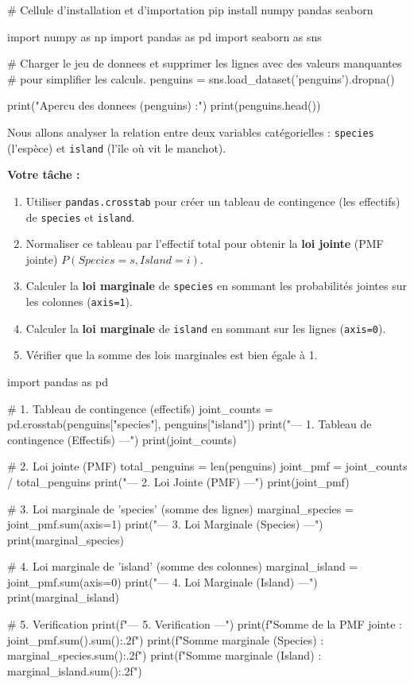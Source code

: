 \begin{codecell}
# Cellule d'installation et d'importation
pip install numpy pandas seaborn
\end{codecell}

\begin{codecell}
import numpy as np
import pandas as pd
import seaborn as sns

# Charger le jeu de donnees et supprimer les lignes avec des valeurs manquantes
# pour simplifier les calculs.
penguins = sns.load_dataset('penguins').dropna()

print("Apercu des donnees (penguins) :")
print(penguins.head())
\end{codecell}

\begin{exercicebox}
Nous allons analyser la relation entre deux variables catégorielles : \texttt{species} (l'espèce) et \texttt{island} (l'île où vit le manchot).

\textbf{Votre tâche :}
\begin{enumerate}
    \item Utiliser \texttt{pandas.crosstab} pour créer un tableau de contingence (les effectifs) de \texttt{species} et \texttt{island}.
    \item Normaliser ce tableau par l'effectif total pour obtenir la \textbf{loi jointe} (PMF jointe) $P(Species=s, Island=i)$.
    \item Calculer la \textbf{loi marginale} de \texttt{species} en sommant les probabilités jointes sur les colonnes (\texttt{axis=1}).
    \item Calculer la \textbf{loi marginale} de \texttt{island} en sommant sur les lignes (\texttt{axis=0}).
    \item Vérifier que la somme des lois marginales est bien égale à 1.
\end{enumerate}

\begin{codecell}
import pandas as pd

# 1. Tableau de contingence (effectifs)
joint_counts = pd.crosstab(penguins["species"], penguins["island"])
print("--- 1. Tableau de contingence (Effectifs) ---")
print(joint_counts)

# 2. Loi jointe (PMF)
total_penguins = len(penguins)
joint_pmf = joint_counts / total_penguins
print("\n--- 2. Loi Jointe (PMF) ---")
print(joint_pmf)

# 3. Loi marginale de 'species' (somme des lignes)
marginal_species = joint_pmf.sum(axis=1)
print("\n--- 3. Loi Marginale (Species) ---")
print(marginal_species)

# 4. Loi marginale de 'island' (somme des colonnes)
marginal_island = joint_pmf.sum(axis=0)
print("\n--- 4. Loi Marginale (Island) ---")
print(marginal_island)

# 5. Verification
print(f"\n--- 5. Verification ---")
print(f"Somme de la PMF jointe : {joint_pmf.sum().sum():.2f}")
print(f"Somme marginale (Species) : {marginal_species.sum():.2f}")
print(f"Somme marginale (Island) : {marginal_island.sum():.2f}")
\end{codecell}
\end{exercicebox}

